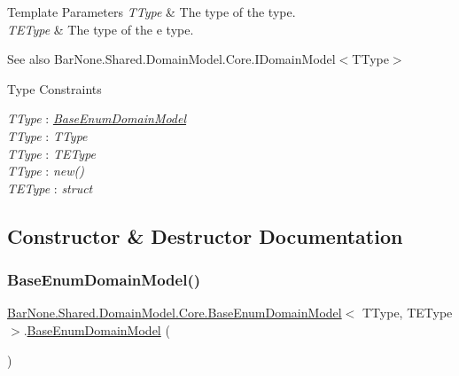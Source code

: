 \begin{DoxyTemplParams}{Template Parameters}
{\em T\+Type} & The type of the type.\\
\hline
{\em T\+E\+Type} & The type of the e type.\\
\hline
\end{DoxyTemplParams}
\begin{DoxySeeAlso}{See also}
Bar\+None.\+Shared.\+Domain\+Model.\+Core.\+I\+Domain\+Model$<$\+T\+Type$>$


\end{DoxySeeAlso}
\begin{Desc}
\item[Type Constraints]\begin{description}
\item[{\em T\+Type} : {\em \mbox{\hyperlink{class_bar_none_1_1_shared_1_1_domain_model_1_1_core_1_1_base_enum_domain_model}{Base\+Enum\+Domain\+Model}}}]\item[{\em T\+Type} : {\em T\+Type}]\item[{\em T\+Type} : {\em T\+E\+Type}]\item[{\em T\+Type} : {\em new()}]\item[{\em T\+E\+Type} : {\em struct}]\end{description}
\end{Desc}


\subsection{Constructor \& Destructor Documentation}
\mbox{\label{class_bar_none_1_1_shared_1_1_domain_model_1_1_core_1_1_base_enum_domain_model_aaeae84370e53d1611ee9e48d671c6194}} 
\subsubsection{\texorpdfstring{Base\+Enum\+Domain\+Model()}{BaseEnumDomainModel()}\hspace{0.1cm}{\footnotesize\ttfamily [1/2]}}
{\footnotesize\ttfamily \mbox{\hyperlink{class_bar_none_1_1_shared_1_1_domain_model_1_1_core_1_1_base_enum_domain_model}{Bar\+None.\+Shared.\+Domain\+Model.\+Core.\+Base\+Enum\+Domain\+Model}}$<$ T\+Type, T\+E\+Type $>$.\mbox{\hyperlink{class_bar_none_1_1_shared_1_1_domain_model_1_1_core_1_1_base_enum_domain_model}{Base\+Enum\+Domain\+Model}} (\begin{DoxyParamCaption}{ }\end{DoxyParamCaption})}



